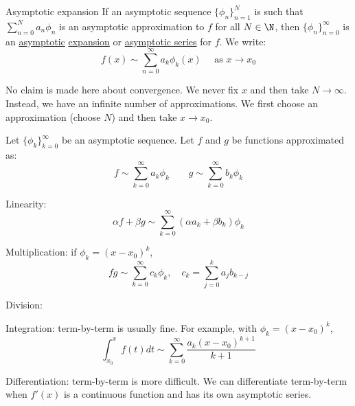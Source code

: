 \documentclass[../Main.tex]{subfiles}
\begin{document}
\begin{definition}{Asymptotic expansion}
    If an asymptotic sequence $\{\phi_n\}_{n = 1}^N$ is such that $\sum_{n=0}^N a_n \phi_n$ is an asymptotic approximation to $f$ for all $N \in \N$, then $\{\phi_n\}_{n = 0}^\infty$ is an \underline{asymptotic} \underline{expansion} or \underline{asymptotic series} for $f$. We write:
    \begin{equation*}
        f(x) \sim \sum_{n=0}^\infty a_k \phi_k(x)\quad\text{ as $x \to x_0$}
    \end{equation*}
\end{definition}
\begin{warning}
    No claim is made here about convergence. We never fix $x$ and then take $N \to \infty$. Instead, we have an infinite number of approximations. We first choose an approximation (choose $N$) and then take $x \to x_0$.
\end{warning}
\begin{propositions}{
        Let $\{\phi_k\}_{k = 0}^\infty$ be an asymptotic sequence. Let $f$ and $g$ be functions approximated as:
        \begin{equation*}
            f \sim \sum_{k=0}^\infty a_k \phi_k\qquad g \sim \sum_{k=0}^\infty b_k \phi_k
        \end{equation*}
        \label{propsAExpSameSeq}
    }
    \item Linearity:
        \begin{equation*}
            \alpha f + \beta g \sim \sum_{k=0}^\infty (\alpha a_k + \beta b_k) \phi_k
        \end{equation*}
    \item Multiplication: if $\phi_k = (x - x_0)^k$,
        \begin{equation*}
            fg \sim \sum_{k=0}^{\infty} c_k \phi_k,\quad c_k = \sum_{j=0}^{k} a_j b_{k-j}
        \end{equation*}
    \item Division: %
    \item Integration: term-by-term is usually fine. For example, with $\phi_k = (x - x_0)^k$,
        \begin{equation*}
            \int_{x_0}^{x} f(t) dt \sim \sum_{k=0}^{\infty} \frac{a_k (x - x_0)^{k+1}}{k+1}
        \end{equation*}
    \item Differentiation: term-by-term is more difficult. We can differentiate term-by-term when $f'(x)$ is a continuous function and has its own asymptotic series.
\end{propositions}
\end{document}

